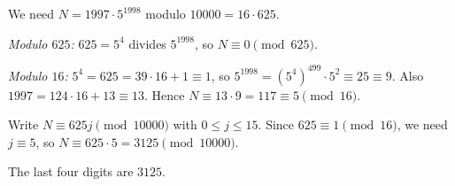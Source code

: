 We need $N=1997\cdot5^{1998}$ modulo $10000=16\cdot625$.

\emph{Modulo $625$:} $625=5^4$ divides $5^{1998}$, so $N\equiv0\pmod{625}$.

\emph{Modulo $16$:} $5^4=625=39\cdot16+1\equiv1$, so $5^{1998}=\left(5^4\right)^{499}\cdot5^2\equiv25\equiv9$. Also $1997=124\cdot16+13\equiv13$. Hence $N\equiv13\cdot9=117\equiv5\pmod{16}$.

Write $N\equiv625j\pmod{10000}$ with $0\le j\le15$. Since $625\equiv1\pmod{16}$, we need $j\equiv5$, so $N\equiv625\cdot5=3125\pmod{10000}$.

The last four digits are $\boxed{3125}$.
